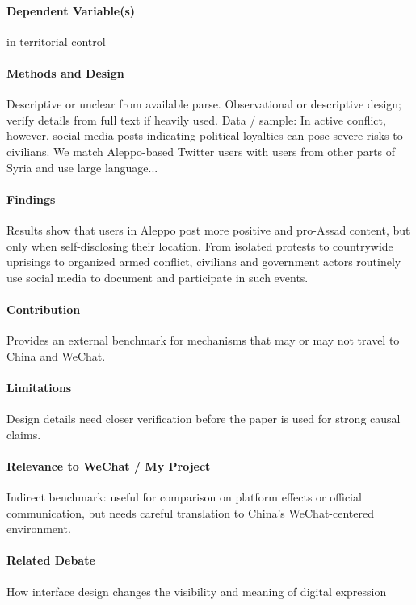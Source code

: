 \documentclass[12pt]{article}
\begin{document}
\paragraph{Dependent Variable(s)} in territorial control

\paragraph{Methods and Design} Descriptive or unclear from available parse. Observational or descriptive design; verify details from full text if heavily used. Data / sample: In active conflict, however, social media posts indicating political loyalties can pose severe risks to civilians. We match Aleppo-based Twitter users with users from other parts of Syria and use large language...

\paragraph{Findings} Results show that users in Aleppo post more positive and pro-Assad content, but only when self-disclosing their location. From isolated protests to countrywide uprisings to organized armed conflict, civilians and government actors routinely use social media to document and participate in such events.

\paragraph{Contribution} Provides an external benchmark for mechanisms that may or may not travel to China and WeChat.

\paragraph{Limitations} Design details need closer verification before the paper is used for strong causal claims.

\paragraph{Relevance to WeChat / My Project} Indirect benchmark: useful for comparison on platform effects or official communication, but needs careful translation to China's WeChat-centered environment.

\paragraph{Related Debate} How interface design changes the visibility and meaning of digital expression
\end{document}
